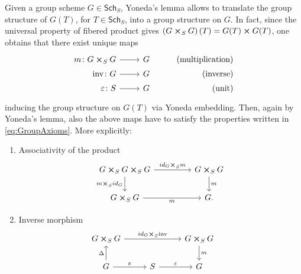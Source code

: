 \documentclass[../Main]{subfiles}
\begin{document}
\begin{rem}[]\label{rem:StructuralMorphisms}
	Given a group scheme $G \in \mathsf{Sch}_{ S }$, Yoneda's lemma allows to translate
	the group structure of $G(T)$, for $T \in \mathsf{Sch}_{ S }$, into a group structure on $G$.
	In fact, since the universal property of
	fibered product gives $\left( G \cross_{ S } G \right)(T) = G(T) \cross G(T)$,
	one obtains that there exist unique maps
	\begin{equation*}
			\begin{tikzcd}[row sep = 0ex
         ,/tikz/column 1/.append style={anchor=base east}
         ,/tikz/column 2/.append style={anchor=base west}
         ,/tikz/column 3/.append style={anchor=base east}]
			m\colon G \cross_{ S } G \arrow[r, "", rightarrow] &
			G & \text{(multiplication)} \\
			\mathrm{inv}\colon G \arrow[r, "", rightarrow] &
			G & \text{(inverse)} \\
			\varepsilon \colon S \arrow[r, "", rightarrow] &
			G & \text{(unit)} 
		\end{tikzcd}
	\end{equation*} 
	inducing the group structure on $G(T)$ via Yoneda embedding.
	Then, again by Yoneda's lemma, also the above maps have to
	satisfy the properties written in 
	\cref{eq:GroupAxioms}.
	More explicitly:
	\begin{enumerate}
		\item Associativity of the product
			\begin{equation*}
			\begin{tikzcd}[column sep=4.5em]
				G \cross_{ S } G \cross_{ S } G 
				\arrow[r, "id_G \cross_S m", rightarrow] 
				\arrow[d, "m \cross_S id_G"', rightarrow] &
				G \cross_{ S } G \arrow[d, "m", rightarrow] \\
				G \cross_{ S } G \arrow[r, "m"', rightarrow] &
				G.
			\end{tikzcd}
			\end{equation*} 
		\item Inverse morphism 
			\begin{equation*}
			\begin{tikzcd}[column sep=2.7em]
				G \cross_{ S } G \arrow[rr, "id_G \cross_S \mathrm{inv}", rightarrow] & &
				G \cross_{ S } G \arrow[d, "m", rightarrow] \\
				G \arrow[u, "\Delta", rightarrow] 
				\arrow[r, "\pi", rightarrow] &
				S \arrow[r, "\varepsilon", rightarrow] & 
				G
			\end{tikzcd}
			\qquad

\end{equation*}
\end{enumerate}
\end{rem}
\end{document}
